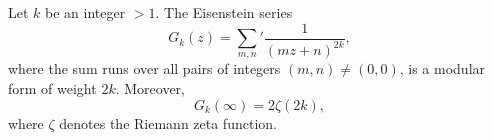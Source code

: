 Let $k$ be an integer $> 1$. The Eisenstein series
$$G_k(z) = \sum_{m,n} {}' \frac{1}{(mz + n)^{2k}},$$
where the sum runs over all pairs of integers $(m, n) \neq (0, 0)$, is a modular form of weight $2k$.
Moreover,
$$G_k(\infty) = 2\zeta(2k),$$
where $\zeta$ denotes the Riemann zeta function.
